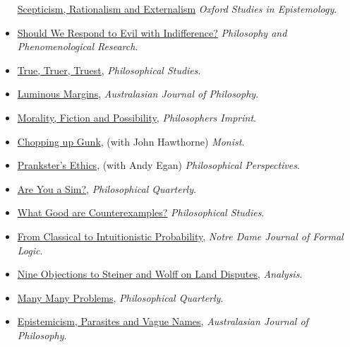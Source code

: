 \documentclass[
  10pt,
  letterpaper,
  DIV=11,
  numbers=noendperiod,
  twoside]{scrartcl}
\begin{document}
\begin{itemize}
  \href{https://brian.weatherson.org/quarto/posts/sre/scepticism-rationalism-and-externalism.html}{Scepticism,
  Rationalism and Externalism} \emph{Oxford Studies in Epistemology}.
\item
  \href{https://brian.weatherson.org/quarto/posts/evil/should-we-respond-to-evil-with-indifference.html}{Should
  We Respond to Evil with Indifference?} \emph{Philosophy and
  Phenomenological Research}.
\item
  \href{https://brian.weatherson.org/quarto/posts/ttt/true-truer-truest.html}{True,
  Truer, Truest}, \emph{Philosophical Studies}.
\item
  \href{https://brian.weatherson.org/quarto/posts/lummarg/luminous-margins.html}{Luminous
  Margins}, \emph{Australasian Journal of Philosophy}.
\item
  \href{https://brian.weatherson.org/quarto/posts/mfp/morality-fiction-and-possibility.html}{Morality,
  Fiction and Possibility}, \emph{Philosophers Imprint}.
\item
  \href{https://brian.weatherson.org/quarto/posts/gunk/chopping-up-gunk.html}{Chopping
  up Gunk}, (with John Hawthorne) \emph{Monist}.
\item
  \href{https://brian.weatherson.org/quarto/posts/prank/pranksters-ethics.html}{Prankster's
  Ethics}, (with Andy Egan) \emph{Philosophical Perspectives}.
\item
  \href{https://brian.weatherson.org/quarto/posts/sims/are-you-a-sim.html}{Are
  You a Sim?}, \emph{Philosophical Quarterly}.
\item
  \href{https://brian.weatherson.org/quarto/posts/wgac/what-good-are-counterexamples.html}{What
  Good are Counterexamples?} \emph{Philosophical Studies}.
\item
  \href{https://brian.weatherson.org/quarto/posts/conprob/from-classical-to-intuitionistic-probability.html}{From
  Classical to Intuitionistic Probability}, \emph{Notre Dame Journal of
  Formal Logic}.
\item
  \href{https://brian.weatherson.org/quarto/posts/nine-obj/nine-objections-to-steiner-and-wolff-on-land-disputes.html}{Nine
  Objections to Steiner and Wolff on Land Disputes}, \emph{Analysis}.
\item
  \href{https://brian.weatherson.org/quarto/posts/mmp/many-many-problems.html}{Many
  Many Problems}, \emph{Philosophical Quarterly}.
\item
  \href{https://brian.weatherson.org/quarto/posts/epvn/epistemicism-parasites-and-vague-names.html}{Epistemicism,
  Parasites and Vague Names}, \emph{Australasian Journal of Philosophy}.

\end{itemize}
\end{document}
